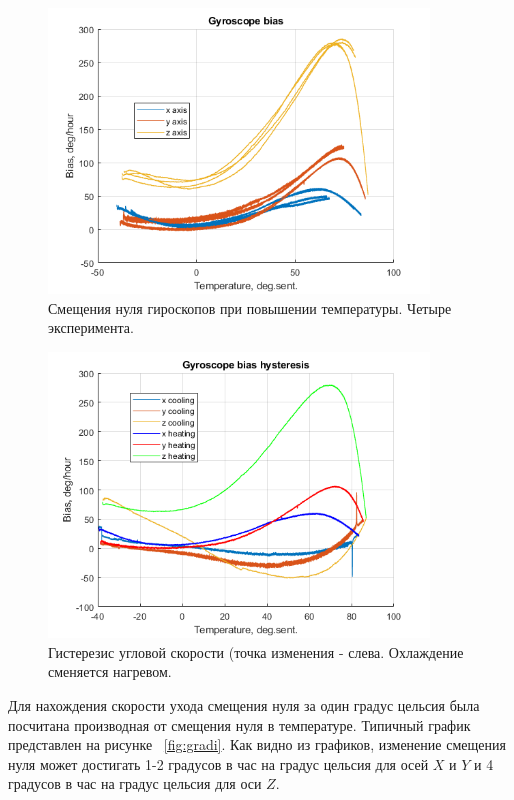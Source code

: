 \documentclass[a4paper,12pt]{article}
\begin{document}
\begin{figure}
\centering
\includegraphics[width=0.9\textwidth]{four_graphs.png} 
\caption{\label{fig:four_exps} Смещения нуля гироскопов при повышении температуры. Четыре эксперимента.}
\end{figure}
\begin{figure}
\centering
\includegraphics[width=0.9\textwidth]{hysteresis.png} 
\caption{\label{fig:hyst} Гистерезис угловой скорости (точка изменения - слева. Охлаждение сменяется нагревом.}
\end{figure}

Для нахождения скорости ухода смещения нуля за один градус цельсия была посчитана производная от смещения нуля в температуре. Типичный график представлен на рисунке  ~\ref{fig:gradi}. Как видно из графиков, изменение смещения нуля может достигать 1-2 градусов в час на градус цельсия для осей $X$ и $Y$ и 4 градусов в час на градус цельсия для  оси $Z$.
\end{document}
